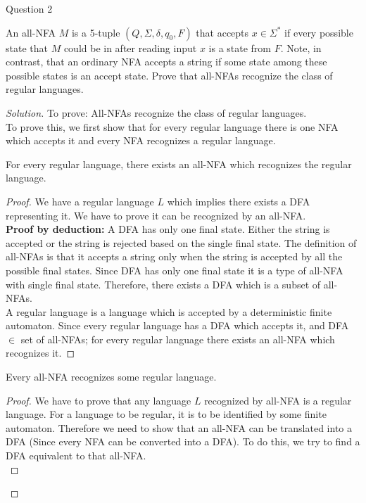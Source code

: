 \begin{solution}{Question 2}\label{ques:2}
    \begin{question}
     An all-NFA $M$ is a 5-tuple $(Q,\Sigma,\delta,q_0,F)$ that accepts $x \in \Sigma^*$ if every possible state that $M$ could be in after reading input $x$ is a state from $F$. Note, in contrast, that an ordinary NFA accepts a string if some state among these possible states is an accept state.  Prove that all-NFAs recognize the class of regular languages.
    \end{question}
    \tcblower{}
    \begin{proof}[Solution]
    To prove: All-NFAs recognize the class of regular languages.\\
    To prove this, we first show that for every regular language there is one NFA which accepts it and every NFA recognizes a regular language.
        \begin{claim}
        For every regular language, there exists an all-NFA which recognizes the regular language.
        \end{claim}
        \begin{proof}
            We have a regular language $L$ which implies there exists a DFA representing it. We have to prove it can be recognized by an all-NFA.\\
            \textbf{Proof by deduction: }
            A DFA has only one final state. Either the string is accepted or the string is rejected based on the single final state. The definition of all-NFAs is that it accepts a string only when the string is accepted by all the possible final states. Since DFA has only one final state it is a type of all-NFA with single final state. Therefore, there exists a DFA which is a subset of all-NFAs.\\
            A regular language is a language which is accepted by a deterministic finite automaton. Since every regular language has a DFA which accepts it, and DFA $\in $ set of all-NFAs; for every regular language there exists an all-NFA which recognizes it.
        \end{proof}
        \begin{claim}
        Every all-NFA recognizes some regular language.
        \end{claim}
        \begin{proof}
            We have to prove that any language $L$ recognized by all-NFA is a regular language. For a language to be regular, it is to be identified by some finite automaton. Therefore we need to show that an all-NFA can be translated into a DFA (Since every NFA can be converted into a DFA). To do this, we try to find a DFA equivalent to that all-NFA.\\

\end{proof}
\end{proof}
\end{solution}
